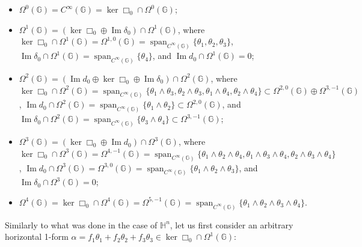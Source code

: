 \documentclass[dvipsnames]{amsart}
\theoremstyle{definition}
\theoremstyle{definition}
\numberwithin{equation}{section}
\newcommand{\G}{\mathbb{G}}
\renewcommand{\H}{\mathbb{H}}
\begin{document}
\begin{itemize}
    \item $\Omega^0(\G)=C^\infty(\G)=\ker\Box_0\cap\Omega^0(\G)$;
    \item $\Omega^1(\G)=(\ker\Box_0\oplus \operatorname{Im}\delta_0)\cap\Omega^1(\G)$, where $\ker\Box_0\cap\Omega^1(\G)=\Omega^{1,0}(\G)=\operatorname{span}_{C^\infty(\G)}\{\theta_1,\theta_2,\theta_3\}$, $\operatorname{Im}\delta_0\cap\Omega^1(\G)=\operatorname{span}_{C^\infty(\G)}\{\theta_4\}$, and $\operatorname{Im}d_0\cap\Omega^1(\G)=0$;
    \item $\Omega^2(\G)=(\operatorname{Im}d_0\oplus\ker\Box_0\oplus\operatorname{Im}\delta_0)\cap\Omega^2(\G)$, where $\ker\Box_0\cap\Omega^{2}(\G)=\operatorname{span}_{C^\infty(\G)}\{\theta_1\wedge\theta_3,\theta_2\wedge\theta_3,\theta_1\wedge\theta_4,\theta_2\wedge\theta_4\}\subset\Omega^{2,0}(\G)\oplus\Omega^{3,-1}(\G)$, $\operatorname{Im}d_0\cap\Omega^2(\G)=\operatorname{span}_{C^\infty(\G)}\{\theta_1\wedge\theta_2\}\subset\Omega^{2,0}(\G)$, and $\operatorname{Im}\delta_0\cap\Omega^2(\G)=\operatorname{span}_{C^\infty(\G)}\{\theta_3\wedge\theta_4\}\subset\Omega^{3,-1}(\G)$;
    \item $\Omega^3(\G)=(\ker\Box_0\oplus\operatorname{Im}d_0)\cap\Omega^3(\G)$, where $\ker\Box_0\cap\Omega^3(\G)=\Omega^{4,-1}(\G)=\operatorname{span}_{C^\infty(\G)}\{\theta_1\wedge\theta_2\wedge\theta_4,\theta_1\wedge\theta_3\wedge\theta_4,\theta_2\wedge\theta_3\wedge\theta_4\}$, $\operatorname{Im}d_0\cap\Omega^3(\G)=\Omega^{3,0}(\G)=\operatorname{span}_{C^\infty(\G)}\{\theta_1\wedge\theta_2\wedge\theta_3\}$, and $\operatorname{Im}\delta_0\cap\Omega^3(\G)=0$;
    \item $\Omega^4(\G)=\ker\Box_0\cap\Omega^4(\G)=\Omega^{5,-1}(\G)=\operatorname{span}_{C^\infty(\G)}\{\theta_1\wedge\theta_2\wedge\theta_3\wedge\theta_4\}$.
\end{itemize}
Similarly to what was done in the case of $\H^n$, let us first consider an arbitrary horizontal 1-form $\alpha=f_1\theta_1+f_2\theta_2+f_3\theta_3\in\ker\Box_0\cap\Omega^1(\G)$:
\end{document}

